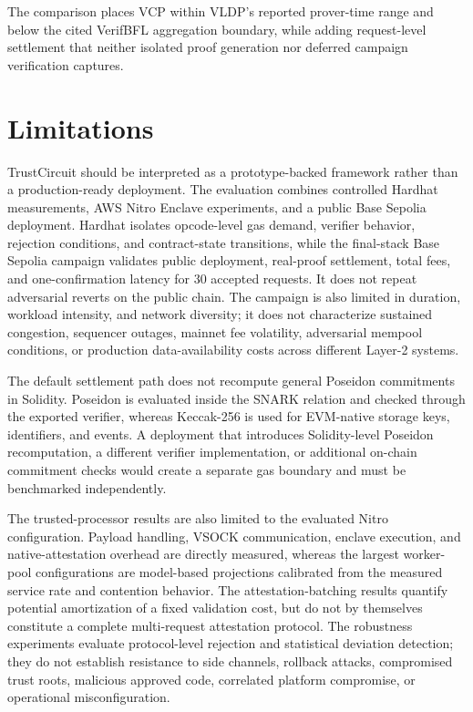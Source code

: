 \documentclass[10pt,journal,compsoc]{IEEEtran}
\begin{document}
The comparison places VCP within VLDP's reported prover-time range and below the cited VerifBFL aggregation boundary, while adding request-level settlement that neither isolated proof generation nor deferred campaign verification captures.
\section{Limitations}
\label{sec:discussion}

TrustCircuit should be interpreted as a prototype-backed framework rather than a production-ready deployment. The evaluation combines controlled Hardhat measurements, AWS Nitro Enclave experiments, and a public Base Sepolia deployment. Hardhat isolates opcode-level gas demand, verifier behavior, rejection conditions, and contract-state transitions, while the final-stack Base Sepolia campaign validates public deployment, real-proof settlement, total fees, and one-confirmation latency for $30$ accepted requests. It does not repeat adversarial reverts on the public chain. The campaign is also limited in duration, workload intensity, and network diversity; it does not characterize sustained congestion, sequencer outages, mainnet fee volatility, adversarial mempool conditions, or production data-availability costs across different Layer-2 systems.

The default settlement path does not recompute general Poseidon commitments in Solidity. Poseidon is evaluated inside the SNARK relation and checked through the exported verifier, whereas Keccak-256 is used for EVM-native storage keys, identifiers, and events. A deployment that introduces Solidity-level Poseidon recomputation, a different verifier implementation, or additional on-chain commitment checks would create a separate gas boundary and must be benchmarked independently.

The trusted-processor results are also limited to the evaluated Nitro configuration. Payload handling, VSOCK communication, enclave execution, and native-attestation overhead are directly measured, whereas the largest worker-pool configurations are model-based projections calibrated from the measured service rate and contention behavior. The attestation-batching results quantify potential amortization of a fixed validation cost, but do not by themselves constitute a complete multi-request attestation protocol. The robustness experiments evaluate protocol-level rejection and statistical deviation detection; they do not establish resistance to side channels, rollback attacks, compromised trust roots, malicious approved code, correlated platform compromise, or operational misconfiguration.
\end{document}
